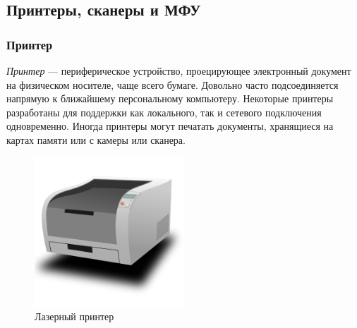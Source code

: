 


\subsection{Принтеры, сканеры и МФУ}\label{base:introduction:components:printers}
\subsubsection{Принтер}\label{base:introduction:components:printers:printer}
\emph{Принтер} --- периферическое устройство, проецирующее электронный документ на физическом носителе, чаще всего бумаге. Довольно часто подсоединяется напрямую к ближайшему персональному компьютеру. Некоторые принтеры разработаны для поддержки как локального, так и сетевого подключения одновременно. Иногда принтеры могут печатать документы, хранящиеся на картах памяти или с камеры или сканера.

\begin{figure}
 \centering
 \includegraphics[width=0.5\textwidth]{base/Introduction/Printer.png}
 \caption{Лазерный принтер}\label{base:introduction:components:printers:printerpic}
\end{figure}

